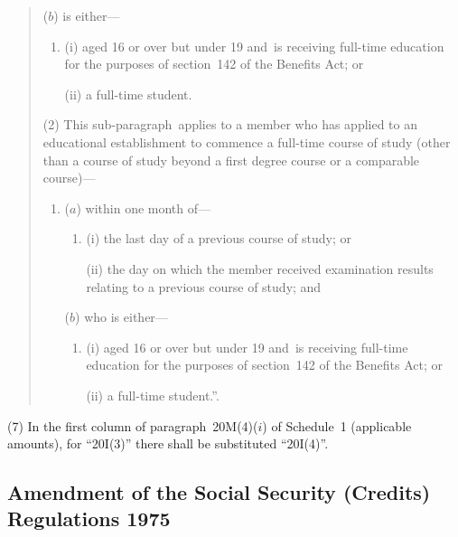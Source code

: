 \documentclass[12pt,a4paper]{article}
\begin{document}
\begin{enumerate}
\begin{quotation}
\begin{enumerate}
($b$) is either—
\begin{enumerate}\item[]
(i) aged 16 or over but under 19 and~is receiving full-time education for the purposes of section~142 of the Benefits Act; or

(ii) a full-time student.
\end{enumerate}
\end{enumerate}

(2) This sub-paragraph~applies to a member who has applied to an educational establishment to commence a full-time course of study (other than a course of study beyond a first degree course or a comparable course)—
\begin{enumerate}\item[]
($a$) within one month of—
\begin{enumerate}\item[]
(i) the last day of a previous course of study; or

(ii) the day on which the member received examination results relating to a previous course of study; and
\end{enumerate}

($b$) who is either—
\begin{enumerate}\item[]
(i) aged 16 or over but under 19 and~is receiving full-time education for the purposes of section~142 of the Benefits Act; or

(ii) a full-time student.”.
\end{enumerate}
\end{enumerate}
\end{quotation}
\end{enumerate}

(7) In the first column of paragraph~20M(4)($i$)  of Schedule~1 (applicable amounts), for “20I(3)” there shall be substituted “20I(4)”.

\subsection[3. Amendment of the Social Security (Credits) Regulations 1975]{Amendment of the Social Security (Credits) Regulations 1975}
\end{document}
